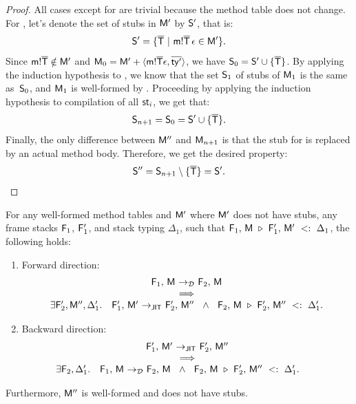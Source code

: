 {\begin{proof}
{  All cases except for  are trivial because the method table
  does not change. For , let's denote the set of stubs in
  $\mtbl'$ by $\S'$, that is:
  \[
    \S' = \{ \ol\Ty\ |\ \meth{\m}{\ol\Ty}{}{\done} \in \mtbl'  \}.
  \]
  Since $\msig\m{\ol\Ty} \notin \mtbl'$ and
  $\mtbl_0 = \mtbl' + \langle \msig\m{\ol{\Ty}}\done, \ol{\ty'} \rangle$,
  we have $\S_0 = \S' \cup \{\ol\Ty\}$.
  By applying the induction hypothesis to
  ,
  we know that the set $\S_1$ of stubs of $\mtbl_1$ is the same as~$\S_0$,
  and $\mtbl_1$ is well-formed by .
  Proceeding by applying the induction hypothesis to compilation of
  all $\st_i$, we get that:
  \[\S_{n+1} = \S_0 = \S' \cup \{\ol\Ty\}.\]
  Finally, the only difference between $\mtbl''$ and $\mtbl_{n+1}$
  is that the stub for \msig\m{\ol\Ty} is replaced by an actual method body.
  Therefore, we get the desired property:
  \[ \S'' = \S_{n+1} \setminus \{\ol\Ty\} = \S'. \]
}
\end{proof}

\begin{lemma}\label{lem:bisim-disp-jit}
  For any well-formed method tables \mtbl and $\mtbl'$
  where $\mtbl'$ does not have stubs,
  any frame stacks $\frm_1$, $\frm'_1$, and stack typing $\Delta_1$,
  such that
$  \optconfig{\frm_1}{\mtbl}{\frm'_1}{\mtbl'}{\Delta_1}$,
  the following holds:
  \begin{enumerate}
    \item Forward direction:
      \[
      \begin{array}{c}
        \config{\frm_1}{\mtbl} \stepd \config{\frm_2}{\mtbl}\\
        \implies\\
        \exists \frm'_2, \mtbl'', \Delta'_1.\quad
          \config{\frm'_1}{\mtbl'} \stepj \config{\frm'_2}{\mtbl''}\ \ \land\ \
          \optconfig{\frm_2}{\mtbl}{\frm'_2}{\mtbl''}{\Delta'_1}.
      \end{array}
      \]
    \item Backward direction:
      \[
      \begin{array}{c}
        \config{\frm'_1}{\mtbl'} \stepj \config{\frm'_2}{\mtbl''}\\
        \implies\\
        \exists \frm_2, \Delta'_1.\quad
          \config{\frm_1}{\mtbl} \stepd \config{\frm_2}{\mtbl}\ \ \land\ \
          \optconfig{\frm_2}{\mtbl}{\frm'_2}{\mtbl''}{\Delta'_1}.\qquad
      \end{array}
      \]
  \end{enumerate}
  Furthermore, $\mtbl''$ is well-formed and does not have stubs.
\end{lemma}

}
